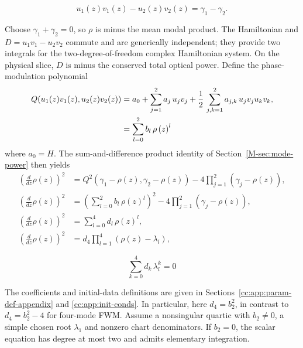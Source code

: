 \documentclass[11pt,a4paper]{article}
\begin{document}
\begin{equation}
\label{cc:eq:power-conserved}
u_1(z) v_1(z) - u_2(z) v_2(z) = \gamma_1 - \gamma_2.
\end{equation}

Choose $\gamma_1+\gamma_2=0$, so $\rho$ is minus the mean modal product.
The Hamiltonian and $D=u_1v_1-u_2v_2$ commute and are generically independent; they provide two integrals for the two-degree-of-freedom complex Hamiltonian system.
On the physical slice, $D$ is minus the conserved total optical power.
Define the phase-modulation polynomial
\begin{align}
Q(u_1(z)v_1(z), u_2(z)v_2(z)) &= a_0 + \sum_{j=1}^{2} a_{j}\, u_j v_j + \frac{1}{2}\,\sum_{j,k=1}^{2} a_{j,k}\, u_j v_j u_k v_k , \notag  \\
& = \sum_{l=0}^{2}b_l\,\rho\left(z\right)^l \label{cc:eq:Q-uv}
\end{align}
where $a_0=H$. The sum-and-difference product identity of Section~\ref*{M-sec:mode-power} then yields
\begin{align}
\left(\frac{d}{d z} \rho{\left(z \right)}\right)^{2} &= Q^{2}{\left({\gamma}_{1} - \rho{\left(z \right)}, {\gamma}_{2}  - \rho{\left(z \right)}\right)} - 4 \prod_{j=1}^{2} \left({\gamma}_{j} - \rho{\left(z \right)}\right), \label{cc:eq:drho-sqrd-1} \\
\left(\frac{d}{d z} \rho{\left(z \right)}\right)^{2} &=  \left(\sum_{l=0}^{2}b_l\,\rho\left(z\right)^l\right)^{2} - 4 \prod_{j=1}^{2} \left({\gamma}_{j} - \rho{\left(z \right)}\right), \label{cc:eq:drho-sqrd-2} \\
\left(\frac{d}{d z} \rho{\left(z \right)}\right)^{2} &= \sum_{l=0}^{4}d_l\,\rho\left(z\right)^l, \label{cc:eq:drho-sqrd-3} \\
\left(\frac{d}{d z} \rho{\left(z \right)}\right)^{2} &= d_4 \prod_{l=1}^{4} \left(\rho\left(z\right) -  \lambda_l\right), \label{cc:eq:drho-sqrd-4}
\end{align}

\begin{equation}
\sum_{k=0}^{4}d_k\,\lambda_{l}^k = 0 \label{cc:eq:lambda-root}
\end{equation}

The coefficients and initial-data definitions are given in Sections~\ref{cc:app:param-def-appendix} and \ref{cc:app:init-conds}.
In particular, here $d_4=b_2^2$, in contrast to $d_4=b_2^2-4$ for four-mode FWM.
Assume a nonsingular quartic with $b_2\ne0$, a simple chosen root $\lambda_1$ and nonzero chart denominators.
If $b_2=0$, the scalar equation has degree at most two and admits elementary integration.
\end{document}
